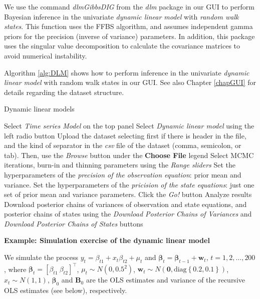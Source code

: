 We use the command \textit{dlmGibbsDIG} from the \textit{dlm} package in our GUI to perform Bayesian inference in the univariate \textit{dynamic linear model} with \textit{random walk states}. This function uses the FFBS algorithm, and assumes independent gamma priors for the precision (inverse of variance) parameters. In addition, this package uses the singular value decomposition to calculate the covariance matrices to avoid numerical instability.

Algorithm \ref{alg:DLM} shows how to perform inference in the univariate \textit{dynamic linear model} with random walk states in our GUI. See also Chapter \ref{chapGUI} for details regarding the dataset structure.

\begin{algorithm}[h!]
	\caption{Dynamic linear models}\label{alg:DLM}
	\begin{algorithmic}[1]  		 			
		\State Select \textit{Time series Model} on the top panel
		\State Select \textit{Dynamic linear model} using the left radio button
		\State Upload the dataset selecting first if there is header in the file, and the kind of separator in the \textit{csv} file of the dataset (comma, semicolon, or tab). Then, use the \textit{Browse} button under the \textbf{Choose File} legend
		\State Select MCMC iterations, burn-in and thinning parameters using the \textit{Range sliders}
		\State Set the hyperparameters of the \textit{precision of the observation equation}: prior mean and variance.
		\State Set the hyperparameters of the \textit{pricision of the state equations}: just one set of prior mean and variance parameters.
		\State Click the \textit{Go!} button
		\State Analyze results
		\State Download posterior chains of variances of observation and state equations, and posterior chains of states using the \textit{Download Posterior Chains of Variances} and \textit{Download Posterior Chains of States} buttons
	\end{algorithmic} 
\end{algorithm}

\textbf{Example: Simulation exercise of the dynamic linear model}

We simulate the process $y_t=\beta_{t1}+{x}_t{\beta}_{t2}+\mu_t$ and $\bm{\beta}_t=\bm{\beta}_{t-1}+\bm{w}_t$, $t=1,2,\dots,200$, where $\bm{\beta}_t=[\beta_{t1} \ {\beta}_{t2}]^{\top}$, $\mu_t\sim N(0,0.5^2)$, $\bm{w}_t\sim N(\bm{0},\text{diag}\left\{0.2,0.1\right\})$, $x_t\sim N(1, 1)$, $\bm{\beta}_0$ and $\bm{B}_0$ are the OLS estimates and variance of the recursive OLS estimates (see below), respectively.

